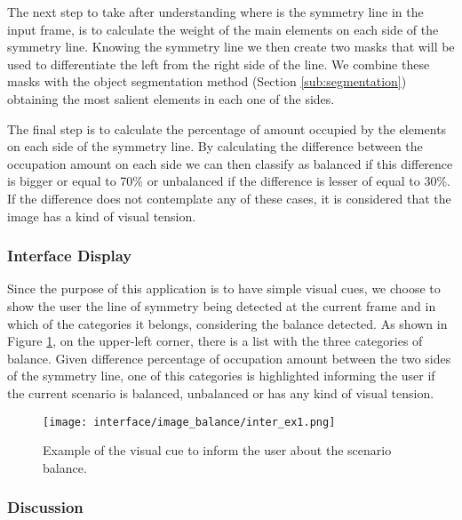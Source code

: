 \begin{description}
	The next step to take after understanding where is the symmetry line in the input frame, is to calculate the weight of the main elements on each side of the symmetry line. Knowing the symmetry line we then create two masks that will be used to differentiate the left from the right side of the line. We combine these masks with the object segmentation method (Section \ref{sub:segmentation}) obtaining the most salient elements in each one of the sides. 
	
	The final step is to calculate the percentage of amount occupied by the elements on each side of the symmetry line. By calculating the difference between the occupation amount on each side we can then classify as balanced if this difference is bigger or equal to 70\% or unbalanced if the difference is lesser of equal to 30\%. If the difference does not contemplate any of these cases, it is considered that the image has a kind of visual tension.
	
\end{description}

\subsubsection{Interface Display}

Since the purpose of this application is to have simple visual cues, we choose to show the user the line of symmetry being detected at the current frame and in which of the categories it belongs, considering the balance detected. As shown in Figure \ref{fig:balance_inter}, on the upper-left corner, there is a list with the three categories of balance. Given difference percentage of occupation amount between the two sides of the symmetry line, one of this categories is highlighted informing the user if the current scenario is balanced, unbalanced or has any kind of visual tension.

\begin{figure}[htbp]
	\centering	
	\texttt{[image: interface/image\_balance/inter\_ex1.png]}
    \caption{Example of the visual cue to inform the user about the scenario balance.}
    \label{fig:balance_inter}
\end{figure}

\subsubsection{Discussion}

